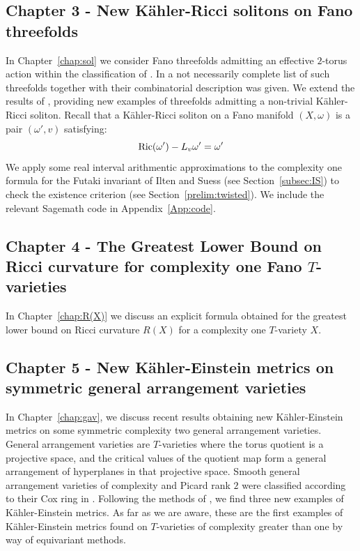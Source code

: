 \subsection*{Chapter 3 - New K\"ahler-Ricci solitons on Fano threefolds} \label{content:riccisolitons}
In Chapter~\ref{chap:sol} we consider Fano threefolds admitting an effective \(2\)-torus action within the classification of \cite{mori1981classification}. In \cite{suss2013fano} a not necessarily complete list of such threefolds together with their combinatorial description was given. We extend the results of \cite{ilten2015}, providing new examples of threefolds admitting a non-trivial K\"ahler-Ricci soliton. Recall that a K\"ahler-Ricci soliton on a Fano manifold \((X,\omega)\) is a pair \((\omega',v)\) satisfying:
\[
\mathop{\rm Ric}\nolimits(\omega') - L_v \omega' = \omega'
\]
We apply some real interval arithmentic approximations to the complexity one formula for the Futaki invariant of Ilten and Suess (see Section~\ref{subsec:IS}) to check the existence criterion \cite{datar2016kahler} (see Section~\ref{prelim:twisted}). We include the relevant Sagemath code in Appendix~\ref{App:code}.
\subsection*{Chapter 4 - The Greatest Lower Bound on Ricci curvature for complexity one Fano $T$-varieties} \label{content:R(X)}
In Chapter~\ref{chap:R(X)} we discuss an explicit formula obtained for the greatest lower bound on Ricci curvature \(R(X)\) for a complexity one \(T\)-variety \(X\).
\subsection*{Chapter 5 - New K\"ahler-Einstein metrics on symmetric general arrangement varieties} \label{content:generalarrangement}
In Chapter~\ref{chap:gav}, we discuss recent results obtaining new K\"ahler-Einstein metrics on some symmetric complexity two general arrangement varieties. General arrangement varieties are \(T\)-varieties where the torus quotient is a projective space, and the critical values of the quotient map form a general arrangement of hyperplanes in that projective space. Smooth general arrangement varieties of complexity and Picard rank \(2\) were classified according to their Cox ring in \cite{hausen2018torus}. Following the methods of \cite{Su13}, we find three new examples of K\"ahler-Einstein metrics. As far as we are aware, these are the first examples of K\"ahler-Einstein metrics found on \(T\)-varieties of complexity greater than one by way of equivariant methods.